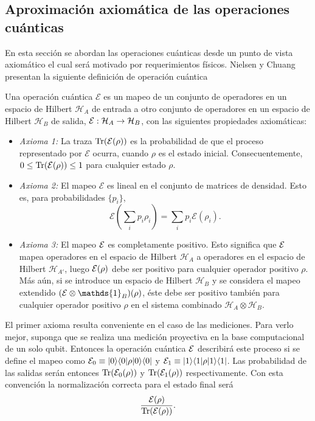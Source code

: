 \subsection{Aproximación axiomática de las operaciones cuánticas} %
En esta sección se abordan las operaciones cuánticas desde un punto de vista
axiomático el cual será motivado por requerimientos físicos. 
Nielsen y
Chuang {\cite{nielsen_chuang_2010}}
presentan la siguiente definición de operación cuántica \begin{definition}\label{DefE(rho)} Una operación cuántica $\mathcal{E}$ es un mapeo de un conjunto de operadores en un espacio de Hilbert $\mathcal{H}_A$ de entrada a otro conjunto de operadores en un espacio de Hilbert $\mathcal{H}_B$ de salida, $\mathcal{E}: \mathcal{H}_A \rightarrow \mathcal{H}_B$, con las siguientes propiedades axiomáticas:

    \begin{itemize}
        \item \textit{Axioma 1:} La traza ${\rm Tr} (\mathcal{E}(\rho))$ es la probabilidad de que el proceso representado por $\mathcal{E}$ ocurra, cuando $\rho$ es el estado inicial. Consecuentemente, $0 \le {\rm Tr} (\mathcal{E}(\rho)) \le 1$ para cualquier estado $\rho$.
	\item \textit{Axioma 2:} El mapeo $\mathcal{E}$ es lineal 
en el conjunto de matrices de densidad.
Esto es, para probabilidades
$\{p_i\}$, \[\mathcal{E}\left(\sum _i p_i \rho _i\right)=\sum_i p_i
\mathcal{E}(\rho_i).\]
	\item\textit{Axioma 3:} El mapeo $\mathcal{E}$ es completamente positivo. Esto
significa que $\mathcal{E}$ mapea  operadores en el espacio de Hilbert
$\mathcal{H}_{A}$  a operadores en el espacio de Hilbert $\mathcal{H}_{A'}$, luego $\mathcal{E}(\rho)$ debe ser positivo para cualquier operador positivo $\rho $. Más aún, si se introduce un espacio de Hilbert $ \mathcal{H}_{B}$ y se considera el mapeo extendido $(\E \otimes \mathds{1}_B)(\rho)$, éste debe ser positivo también para cualquier operador positivo $\rho$ en el sistema combinado $\mathcal{H}_A\otimes \mathcal{H}_B$. 
    \end{itemize}
\end{definition}

El primer axioma resulta conveniente en  el caso de las mediciones. Para verlo
mejor, suponga que se realiza una medición
proyectiva en la base computacional de un solo qubit. Entonces la operación
cuántica $\mathcal{E}$ describirá este proceso si se define el mapeo como
$\mathcal{E}_0\equiv|0\rangle \langle0|\rho |0\rangle \langle 0|$ y $\mathcal{E}_1\equiv|1\rangle \langle1|\rho |1\rangle \langle 1|$.
Las probabilidad de las salidas serán entonces ${\rm Tr} (\mathcal{E}_0(\rho))$ y ${\rm Tr}
(\mathcal{E}_1(\rho))$ respectivamente.  Con esta convención la normalización correcta
para el estado final será \[\dfrac{\mathcal{E}(\rho)}{{\rm Tr} (\mathcal{E} (\rho))}.\]

